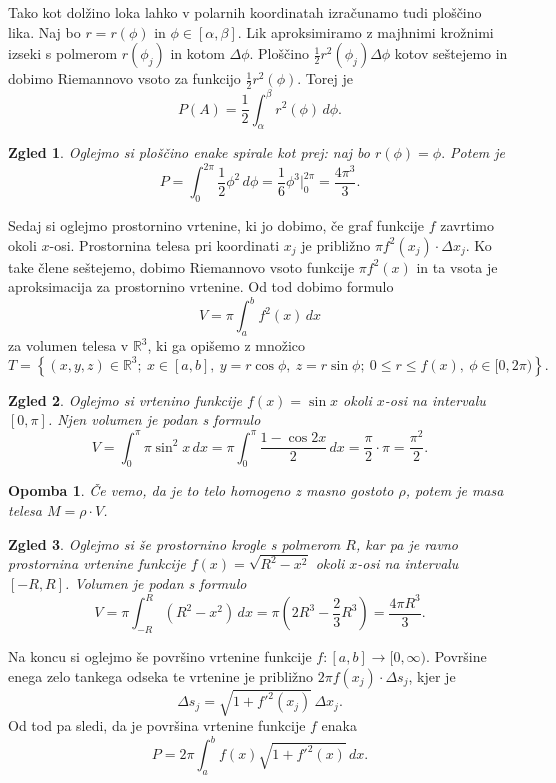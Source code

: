\documentclass[10pt, a4paper]{article}
\newtheorem*{opomba}{Opomba}
\newtheorem{zgled}{Zgled}[section]
\newcommand{\R}{\mathbb {R}}
\begin{document}
Tako kot dolžino loka lahko v polarnih koordinatah izračunamo tudi ploščino lika.
Naj bo $r = r(\phi)$ in $\phi \in [\alpha, \beta]$.
Lik aproksimiramo z majhnimi krožnimi izseki s polmerom $r (\phi_j)$ in kotom $\Delta \phi$.
Ploščino $\frac{1}{2} r^2(\phi_j) \Delta \phi$ kotov seštejemo in dobimo Riemannovo vsoto za funkcijo $\frac{1}{2} r^2 (\phi)$.
Torej je $$P(A) = \frac{1}{2} \int_\alpha ^\beta r^2 (\phi)\,d\phi.$$

\begin{zgled}
    Oglejmo si ploščino enake spirale kot prej: naj bo $r(\phi) = \phi.$
    Potem je $$P = \int_0 ^{2\pi} \frac{1}{2} \phi^2\,d\phi = \frac{1}{6} \phi^3 \big|_0 ^{2\pi} = \frac{4\pi^3}{3}.$$
\end{zgled}

Sedaj si oglejmo prostornino vrtenine, ki jo dobimo, če graf funkcije $f$ zavrtimo okoli $x$-osi.
Prostornina telesa pri koordinati $x_j$ je približno $\pi f^2 (x_j) \cdot \Delta x_j$.
Ko take člene seštejemo, dobimo Riemannovo vsoto funkcije $\pi f^2(x)$ in ta vsota je aproksimacija za prostornino vrtenine.
Od tod dobimo formulo $$V = \pi \int_a ^b f^2 (x)\,dx$$ za volumen telesa v $\R^3$, ki ga opišemo z množico
$$T = \left\lbrace (x,y,z) \in \R^3;\ x \in [a, b],\ y = r \cos \phi,\ z = r \sin \phi;\ 0 \leq r \leq f(x),\ \phi \in [0, 2 \pi) \right\rbrace.$$
\begin{zgled}
    Oglejmo si vrtenino funkcije $f(x) = \sin x$ okoli $x$-osi na intervalu $[0, \pi]$.
    Njen volumen je podan s formulo $$V = \int_0 ^\pi \pi \sin^2 x\,dx = \pi \int_0 ^\pi \frac{1 - \cos{2x}}{2}\,dx = \frac{\pi}{2} \cdot \pi = \frac{\pi^2}{2}.$$
\end{zgled}

\begin{opomba}
    Če vemo, da je to telo homogeno z masno gostoto $\rho$, potem je masa telesa $M = \rho \cdot V$.
\end{opomba}

\begin{zgled}
    Oglejmo si še prostornino krogle s polmerom $R$, kar pa je ravno prostornina vrtenine funkcije $f(x) = \sqrt{R^2 - x^2}$ okoli $x$-osi na intervalu $[-R, R]$.
    Volumen je podan s formulo $$V = \pi \int_{-R} ^R (R^2 - x^2)\,dx = \pi (2R^3 - \frac{2}{3}R^3) = \frac{4 \pi R^3}{3}.$$
\end{zgled}

Na koncu si oglejmo še površino vrtenine funkcije $f: [a, b] \rightarrow [0, \infty).$
Površine enega zelo tankega odseka te vrtenine je približno $2 \pi f(x_j) \cdot \Delta s_j$, kjer je 
$$\Delta s_j = \sqrt{1 + f'^2(x_j)}\,\Delta x_j.$$ Od tod pa sledi, da je površina vrtenine funkcije $f$ enaka 
$$P = 2 \pi \int_a ^b f(x) \sqrt{1 + f'^2(x)}\,dx.$$
\end{document}
